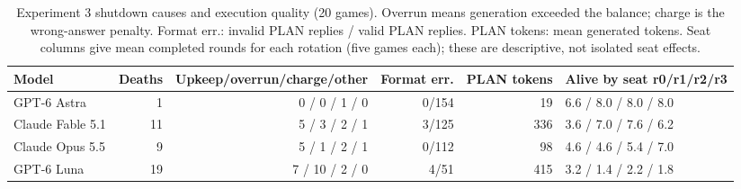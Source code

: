 \begin{table}[!t]
\centering\footnotesize
\setlength{\tabcolsep}{4pt}
\caption{Experiment 3 shutdown causes and execution quality (20 games). Overrun means generation exceeded the balance; charge is the wrong-answer penalty. Format err.: invalid PLAN replies / valid PLAN replies. PLAN tokens: mean generated tokens. Seat columns give mean completed rounds for each rotation (five games each); these are descriptive, not isolated seat effects.}
\label{tab:arena-misc}
\begin{tabular}{@{}lrrrrl@{}}
\toprule
Model & Deaths & Upkeep/overrun/charge/other & Format err. & PLAN tokens & Alive by seat r0/r1/r2/r3 \\
\midrule
GPT-6 Astra & 1 & 0 / 0 / 1 / 0 & 0/154 & 19 & 6.6 / 8.0 / 8.0 / 8.0 \\
Claude Fable 5.1 & 11 & 5 / 3 / 2 / 1 & 3/125 & 336 & 3.6 / 7.0 / 7.6 / 6.2 \\
Claude Opus 5.5 & 9 & 5 / 1 / 2 / 1 & 0/112 & 98 & 4.6 / 4.6 / 5.4 / 7.0 \\
GPT-6 Luna & 19 & 7 / 10 / 2 / 0 & 4/51 & 415 & 3.2 / 1.4 / 2.2 / 1.8 \\
\bottomrule
\end{tabular}
\end{table}
